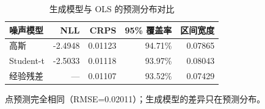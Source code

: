 \begin{table}[htbp]
\centering
\caption{生成模型与 OLS 的预测分布对比}
\label{tab:generativepred}
\small
\begin{tabular}{lrrrr}
\toprule
噪声模型 & NLL & CRPS & 95\% 覆盖率 & 区间宽度 \\
\midrule
高斯 & -2.4948 & 0.01123 & 94.71\% & 0.07865 \\
Student-t & -2.5033 & 0.01118 & 93.97\% & 0.08043 \\
经验残差 & — & 0.01107 & 93.52\% & 0.07429 \\
\bottomrule
\end{tabular}
\par\vspace{2pt}\footnotesize 点预测完全相同（RMSE=0.02011）；生成模型的差异只在预测分布。
\end{table}
